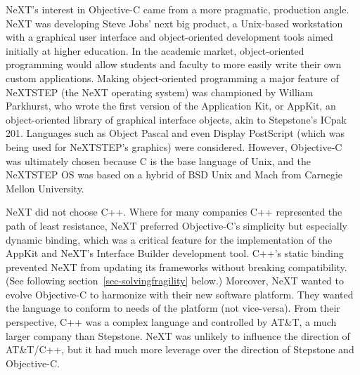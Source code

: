 \documentclass[acmsmall]{acmart}\settopmatter{}
\begin{document}
NeXT's interest in Objective-C came from a more pragmatic, production angle. NeXT was developing Steve Jobs' next big product, a Unix-based workstation with a graphical user interface and object-oriented development tools aimed initially at higher education. In the academic market, object-oriented programming would allow students and faculty to more easily write their own custom applications. Making object-oriented programming a major feature of NeXTSTEP (the NeXT operating system) was championed by William Parkhurst, who wrote the first version of the Application Kit, or AppKit, an object-oriented library of graphical interface objects, akin to Stepstone's ICpak 201. Languages such as Object Pascal and even Display PostScript (which was being used for NeXTSTEP's graphics) were considered. However, Objective-C was ultimately chosen because C is the base language of Unix, and the NeXTSTEP OS was based on a hybrid of BSD Unix and Mach from Carnegie Mellon University.

NeXT did not choose C++. Where for many companies C++ represented the path of least resistance, NeXT preferred Objective-C's simplicity but especially dynamic binding, which was a critical feature for the implementation of the AppKit and NeXT's Interface Builder development tool. C++'s static binding prevented NeXT from updating its frameworks without breaking compatibility. (See following section~\ref{sec-solvingfragility} below.) Moreover, NeXT wanted to evolve Objective-C to harmonize with their new software platform. They wanted the language to conform to needs of the platform (not vice-versa). From their perspective, C++ was a complex language and controlled by AT\&T, a much larger company than Stepstone. NeXT was unlikely to influence the direction of AT\&T/C++, but it had much more leverage over the direction of Stepstone and Objective-C. 
\end{document}
